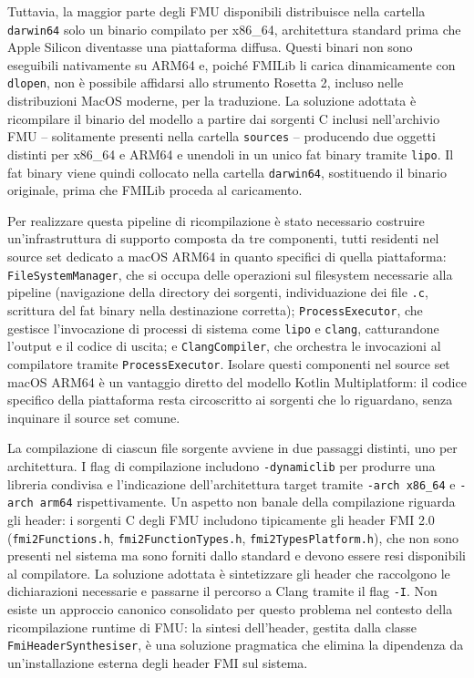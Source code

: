 Tuttavia, la maggior parte degli FMU disponibili distribuisce nella cartella \texttt{darwin64} solo un binario compilato per x86\_64, architettura standard prima che Apple Silicon diventasse una piattaforma diffusa. Questi binari non sono eseguibili nativamente su ARM64 e, poiché FMILib li carica dinamicamente con \texttt{dlopen}, non è possibile affidarsi allo strumento Rosetta 2, incluso nelle distribuzioni MacOS moderne, per la traduzione. La soluzione adottata è ricompilare il binario del modello a partire dai sorgenti C inclusi nell'archivio FMU -- solitamente presenti nella cartella \texttt{sources} -- producendo due oggetti distinti per x86\_64 e ARM64 e unendoli in un unico fat binary tramite \texttt{lipo}. Il fat binary viene quindi collocato nella cartella \texttt{darwin64}, sostituendo il binario originale, prima che FMILib proceda al caricamento.

Per realizzare questa pipeline di ricompilazione è stato necessario costruire un'infrastruttura di supporto composta da tre componenti, tutti residenti nel source set dedicato a macOS ARM64 in quanto specifici di quella piattaforma: \texttt{FileSystemManager}, che si occupa delle operazioni sul filesystem necessarie alla pipeline (navigazione della directory dei sorgenti, individuazione dei file \texttt{.c}, scrittura del fat binary nella destinazione corretta); \texttt{ProcessExecutor}, che gestisce l'invocazione di processi di sistema come \texttt{lipo} e \texttt{clang}, catturandone l'output e il codice di uscita; e \texttt{ClangCompiler}, che orchestra le invocazioni al compilatore tramite \texttt{ProcessExecutor}. Isolare questi componenti nel source set macOS ARM64 è un vantaggio diretto del modello Kotlin Multiplatform: il codice specifico della piattaforma resta circoscritto ai sorgenti che lo riguardano, senza inquinare il source set comune.

La compilazione di ciascun file sorgente avviene in due passaggi distinti, uno per architettura. I flag di compilazione includono \texttt{-dynamiclib} per produrre una libreria condivisa e l'indicazione dell'architettura target tramite \texttt{-arch x86\_64} e \texttt{-arch arm64} rispettivamente. Un aspetto non banale della compilazione riguarda gli header: i sorgenti C degli FMU includono tipicamente gli header FMI 2.0 (\texttt{fmi2Functions.h}, \texttt{fmi2FunctionTypes.h}, \texttt{fmi2TypesPlatform.h}), che non so\-no presenti nel sistema ma sono forniti dallo standard e devono essere resi disponibili al compilatore. La soluzione adottata è sintetizzare gli header che raccolgono le dichiarazioni necessarie e passarne il percorso a Clang tramite il flag \texttt{-I}. Non esiste un approccio canonico consolidato per questo problema nel contesto della ricompilazione runtime di FMU: la sintesi dell'header, gestita dalla classe \texttt{FmiHeaderSynthesiser}, è una soluzione pragmatica che elimina la dipendenza da un'installazione esterna degli header FMI sul sistema.

